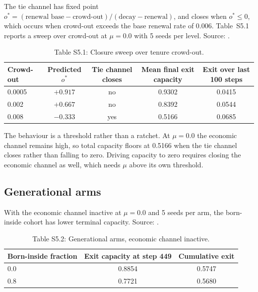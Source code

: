 \documentclass[12pt]{article}
\begin{document}
The tie channel has fixed point
$o^{*} = (\text{renewal base} - \text{crowd-out})/(\text{decay} - \text{renewal})$,
and closes when $o^{*} \leq 0$, which occurs when crowd-out exceeds the base
renewal rate of 0.006. Table~S5.1 reports a sweep over crowd-out at
$\mu = 0.0$ with 5 seeds per level. Source:
.

\begin{table}[htbp]
\centering
\small
\caption{Table S5.1: Closure sweep over tenure crowd-out.}
\begin{tabular}{lcccc}
\toprule
Crowd-out & Predicted $o^{*}$ & Tie channel closes & Mean final exit capacity & Exit over last 100 steps \\
\midrule
0.0005 & $+0.917$ & no & 0.9302 & 0.0415 \\
0.002 & $+0.667$ & no & 0.8392 & 0.0544 \\
0.008 & $-0.333$ & yes & 0.5166 & 0.0685 \\
\bottomrule
\end{tabular}
\end{table}

The behaviour is a threshold rather than a ratchet. At $\mu=0.0$ the economic
channel remains high, so total capacity floors at 0.5166 when the tie channel
closes rather than falling to zero. Driving capacity to zero requires closing
the economic channel as well, which needs $\mu$ above its own threshold.

\subsection{Generational arms}

With the economic channel inactive at $\mu=0.0$ and 5 seeds per arm, the
born-inside cohort has lower terminal capacity. Source:
.

\begin{table}[htbp]
\centering
\small
\caption{Table S5.2: Generational arms, economic channel inactive.}
\begin{tabular}{lcc}
\toprule
Born-inside fraction & Exit capacity at step 449 & Cumulative exit \\
\midrule
0.0 & 0.8854 & 0.5747 \\
0.8 & 0.7721 & 0.5680 \\
\bottomrule
\end{tabular}
\end{table}
\end{document}
